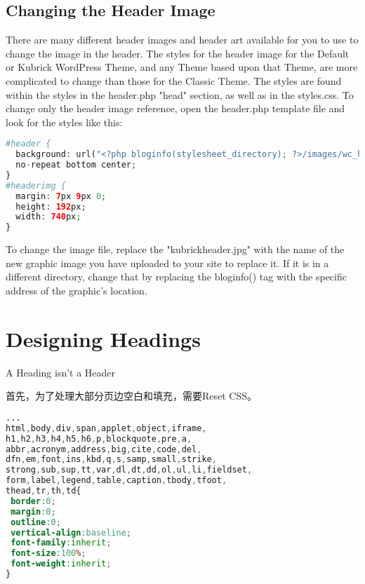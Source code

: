 \subsection{Changing the Header Image}


There are many different header images and header art available for you to use to change the image in the header. The styles for the header image for the Default or Kubrick WordPress Theme, and any Theme based upon that Theme, are more complicated to change than those for the Classic Theme. The styles are found within the styles in the header.php "head" section, as well as in the styles.css. To change only the header image reference, open the header.php template file and look for the styles like this:

\begin{lstlisting}[language=PHP]
#header {
  background: url("<?php bloginfo(stylesheet_directory); ?>/images/wc_header.jpg")
  no-repeat bottom center;
}
#headerimg {
  margin: 7px 9px 0;
  height: 192px;
  width: 740px;
}
\end{lstlisting}

To change the image file, replace the "kubrickheader.jpg" with the name of the new graphic image you have uploaded to your site to replace it. If it is in a different directory, change that by replacing the bloginfo() tag with the specific address of the graphic's location.





\section{Designing Headings}


\begin{shaded}
\begin{center}A Heading isn't a Header\end{center}
\end{shaded}

首先，为了处理大部分页边空白和填充，需要Reset CSS。

\begin{lstlisting}[language=CSS]
...
html,body,div,span,applet,object,iframe,
h1,h2,h3,h4,h5,h6,p,blockquote,pre,a,
abbr,acronym,address,big,cite,code,del,
dfn,em,font,ins,kbd,q,s,samp,small,strike,
strong,sub,sup,tt,var,dl,dt,dd,ol,ul,li,fieldset,
form,label,legend,table,caption,tbody,tfoot,
thead,tr,th,td{
 border:0;
 margin:0;
 outline:0;
 vertical-align:baseline;
 font-family:inherit;
 font-size:100%;
 font-weight:inherit;
}
\end{lstlisting}

